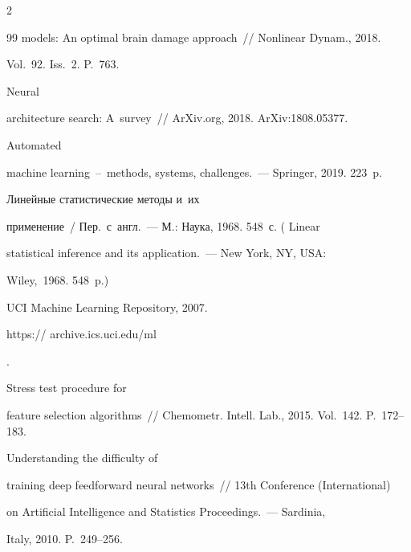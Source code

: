 \begin{multicols}{2}
{{\begin{thebibliography}{99}
models: An optimal brain damage approach~// Nonlinear Dynam., 2018. 


Vol.~92. Iss.~2. P.~763.




 Neural 


architecture search: A~survey~// ArXiv.org, 2018. ArXiv:1808.05377.




 Automated 


machine learning~--~methods, systems, challenges.~--- Springer, 2019. 223~p.




 Линейные статистические методы и~их 


применение~/ Пер.~с~англ.~--- М.: Наука, 1968. 548~с. ( Linear 


statistical inference and its application.~--- New York, NY, USA: 


Wiley,~1968. 548~p.)




UCI Machine Learning Repository, 2007. {\sf 


https:// archive.ics.uci.edu/ml}.




 Stress test procedure for 


feature selection algorithms~// Chemometr. Intell. Lab., 2015. Vol.~142. P.~172--183.


  Understanding the difficulty of 


training deep feedforward neural networks~// 13th Conference (International) 


on Artificial Intelligence and Statistics Proceedings.~--- Sardinia, 


Italy, 2010. P.~249--256.


\end{thebibliography}





 }


 }





\end{multicols}






